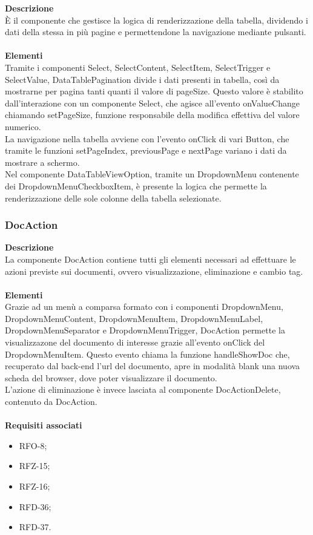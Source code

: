 \textbf{Descrizione}\\
È il componente che gestisce la logica di renderizzazione della tabella, dividendo i dati della stessa in più pagine e permettendone la navigazione mediante pulsanti.\\ \\
\textbf{Elementi}\\
Tramite i componenti Select, SelectContent, SelectItem, SelectTrigger e SelectValue, DataTablePagination divide i dati presenti in tabella, così da mostrarne per pagina tanti quanti il valore di pageSize. Questo valore è stabilito dall'interazione con un componente Select, che agisce all'evento onValueChange chiamando setPageSize, funzione responsabile della modifica effettiva del valore numerico.\\
La navigazione nella tabella avviene con l'evento onClick di vari Button, che tramite le funzioni setPageIndex, previousPage e nextPage variano i dati da mostrare a schermo.\\
Nel componente DataTableViewOption, tramite un DropdownMenu contenente dei DropdownMenuCheckboxItem, è presente la logica che permette la renderizzazione delle sole colonne della tabella selezionate.

\subsubsection{DocAction}

\textbf{Descrizione}\\
La componente DocAction contiene tutti gli elementi necessari ad effettuare le azioni previste sui documenti, ovvero visualizzazione, eliminazione e cambio tag.\\ \\
\textbf{Elementi}\\
Grazie ad un menù a comparsa formato con i componenti DropdownMenu, DropdownMenuContent, DropdownMenuItem, DropdownMenuLabel, DropdownMenuSeparator e DropdownMenuTrigger, DocAction permette la visualizzazone del documento di interesse grazie all'evento onClick del DropdownMenuItem. Questo evento chiama la funzione handleShowDoc che, recuperato dal back-end l'url del documento, apre in modalità blank una nuova scheda del browser, dove poter visualizzare il documento.\\
L'azione di eliminazione è invece lasciata al componente DocActionDelete, contenuto da DocAction.\\ \\
\textbf{Requisiti associati}
\begin{itemize}[itemsep=-4pt]
    \item RFO-8;
    \item RFZ-15;
    \item RFZ-16;
    \item RFD-36;
    \item RFD-37.
\end{itemize}

